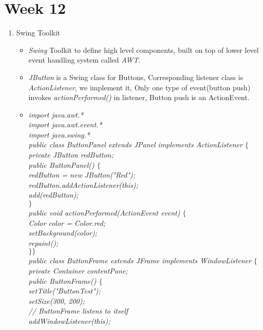 \documentclass[a4paper]{article}
\begin{document}
\section{Week 12}
\begin{enumerate}
    \item Swing Toolkit
    \begin{itemize}
        \item \textit{Swing} Toolkit to define high level components, built on top of lower level event handling system called \textit{AWT}.
        \item \textit{JButton} is a Swing class for Buttons, Corresponding listener class is \textit{ActionListener}, we implement it, Only one type of event(button push) invokes \textit{actionPerformed()} in listener, Button push is an ActionEvent.
        \item \textit{import java.awt.*}\\
        \textit{import java.awt.event.*}\\
        \textit{import java.swing.*}\\
        \textit{public class ButtonPanel extends JPanel implements ActionListener $\{$\\
        private JButton redButton;\\
        public ButtonPanel() $\{$\\
        redButton = new JButton("Red");\\
        redButton.addActionListener(this);\\
        add(redButton);\\
        $\}$\\
        public void actionPerformed(ActionEvent event) $\{$\\
        Color color = Color.red;\\
        setBackground(color);\\
        repaint();\\
        $\}\}$\\
        public class ButtonFrame extends JFrame implements WindowListener $\{$\\
        private Container contentPane;\\
        public ButtonFrame() $\{$\\
        setTitle("ButtonTest");\\
        setSize(300, 200);\\
        // ButtonFrame listens to itself\\
        addWindowListener(this);\\
}
\end{itemize}
\end{enumerate}
\end{document}
